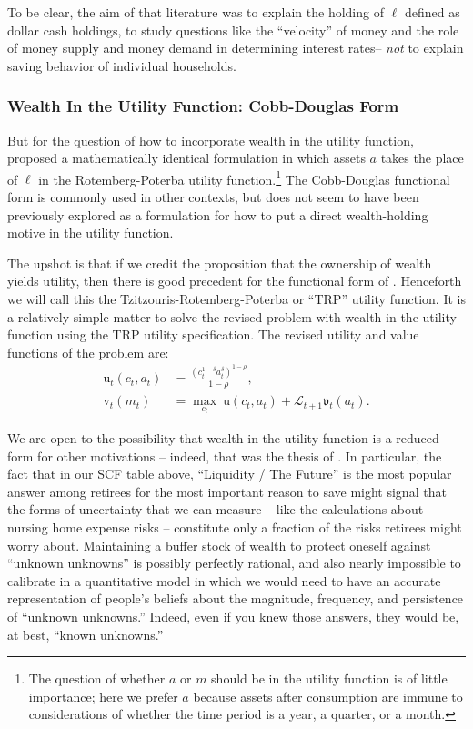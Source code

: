 \documentclass{article}
\newcommand{\CRRA}{\rho}
\newcommand{\uFunc}{\mathrm{u}}
\newcommand{\vFunc}{\mathrm{v}}
\newcommand{\Alive}{\mathcal{L}}
\newcommand{\cNrm}{c}
\newcommand{\aNrm}{a}
\newcommand{\mNrm}{m}
\newcommand{\lqdt}{\ell}
\begin{document}
To be clear, the aim of that literature was to explain the holding of $\lqdt$ defined as dollar cash holdings, to study questions like the ``velocity'' of money and the role of money supply and money demand in determining interest rates-- \textit{not} to explain saving behavior of individual households.

\subsubsection{Wealth In the Utility Function: Cobb-Douglas Form}

But for the question of how to incorporate wealth in the utility function, \cite{Tzitzouris2024} proposed a mathematically identical formulation in which assets $\aNrm$ takes the place of $\lqdt$ in the Rotemberg-Poterba utility function.\footnote{The question of whether $\aNrm$ or $\mNrm$ should be in the utility function is of little importance; here we prefer $\aNrm$ because assets after consumption are immune to considerations of whether the time period is a year, a quarter, or a month.}
The Cobb-Douglas functional form is commonly used in other contexts, but does not seem to have been previously explored as a formulation for how to put a direct wealth-holding motive in the utility function.


The upshot is that if we credit the proposition that the ownership of wealth yields utility, then there is good precedent for the functional form of \cite{Tzitzouris2024}.
Henceforth we will call this the Tzitzouris-Rotemberg-Poterba or ``TRP'' utility function.
It is a relatively simple matter to solve the revised problem with wealth in the utility function using the TRP utility specification. The revised utility and value functions of the problem are:
\begin{align}
    \uFunc_t(\cNrm_t, \aNrm_t) & = \frac{\left(\cNrm_t^{1-\delta}\aNrm_t^{\delta}\right)^{1-\CRRA}}{1-\CRRA}, \\
    {\vFunc}_{t}({\mNrm}_{t}) & = \max_{\cNrm_{t}} ~ \uFunc(\cNrm_{t}, \aNrm_{t})+\Alive_{t+1}\mathfrak{v}_{t}(a_{t}).
\end{align}

We are open to the possibility that wealth in the utility function is a reduced form for other motivations -- indeed, that was the thesis of \cite{WhyDoTheRich}.
In particular, the fact that in our SCF table above, ``Liquidity / The Future'' is the most popular answer among retirees for the most important reason to save might signal that the forms of uncertainty that we can measure -- like the \cite{Ameriks2020jpe} calculations about nursing home expense risks -- constitute only a fraction of the risks retirees might worry about.
Maintaining a buffer stock of wealth to protect oneself against ``unknown unknowns'' is possibly perfectly rational, and also nearly impossible to calibrate in a quantitative model in which we would need to have an accurate representation of people's beliefs about the magnitude, frequency, and persistence of ``unknown unknowns.''
Indeed, even if you knew those answers, they would be, at best, ``known unknowns.''
\end{document}
